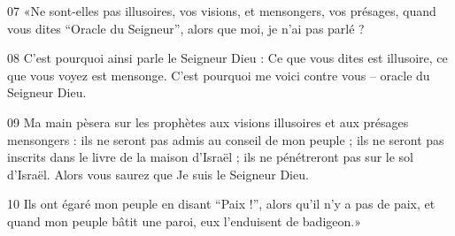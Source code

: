 
07 «Ne sont-elles pas illusoires, vos visions, et mensongers, vos présages, quand vous dites “Oracle du Seigneur”, alors que moi, je n’ai pas parlé ?

08 C’est pourquoi ainsi parle le Seigneur Dieu : Ce que vous dites est illusoire, ce que vous voyez est mensonge. C’est pourquoi me voici contre vous – oracle du Seigneur Dieu.

09 Ma main pèsera sur les prophètes aux visions illusoires et aux présages mensongers : ils ne seront pas admis au conseil de mon peuple ; ils ne seront pas inscrits dans le livre de la maison d’Israël ; ils ne pénétreront pas sur le sol d’Israël. Alors vous saurez que Je suis le Seigneur Dieu.

10 Ils ont égaré mon peuple en disant “Paix !”, alors qu’il n’y a pas de paix, et quand mon peuple bâtit une paroi, eux l’enduisent de badigeon.»
